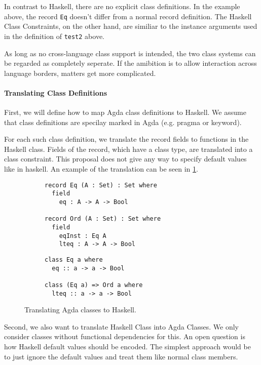 \documentclass[12pt, a4paper, twoside]{report}
\begin{document}
In contrast to Haskell, there are no explicit class definitions. In the example above,
the record \texttt{Eq} doesn't differ from a normal record definition.
The Haskell Class Constraints, on the other hand, are similiar to the instance
arguments used in the definition of \texttt{test2} above.

As long as no cross-language class support is intended, the two class systems can be
regarded as completely seperate. If the amibition is to allow interaction across
language borders, matters get more complicated.

\paragraph{Translating Class Definitions}
First, we will define how to map Agda class definitions to Haskell. We assume
that class definitions are specilay marked in Agda (e.g. pragma or keyword).

For each such class definition, we translate the record fields to functions
in the Haskell class. Fields of the record, which have a class type, are
translated into a class constraint. This proposal does not give any way
to specify default values like in haskell. An example of the translation
can be seen in \ref{lst:cls-agda-hs}.
\begin{figure}
\begin{subfigure}[b]{0.5\textwidth}
\begin{lstlisting}
record Eq (A : Set) : Set where
  field
    eq : A -> A -> Bool

record Ord (A : Set) : Set where
  field
    eqInst : Eq A
    lteq : A -> A -> Bool
\end{lstlisting}
\end{subfigure}
\hspace{10pt}
\begin{subfigure}[b]{0.5\textwidth}
\begin{lstlisting}
class Eq a where
  eq :: a -> a -> Bool

class (Eq a) => Ord a where
  lteq :: a -> a -> Bool
\end{lstlisting}
\end{subfigure}
\caption{Translating Agda classes to Haskell.}
\label{lst:cls-agda-hs}
\end{figure}


Second, we also want to translate Haskell Class into Agda Classes. We only
consider classes without functional dependencies for this. An open question is
how Haskell default values should be encoded. The simplest approach would be
to just ignore the default values and treat them like normal class members.
\end{document}
